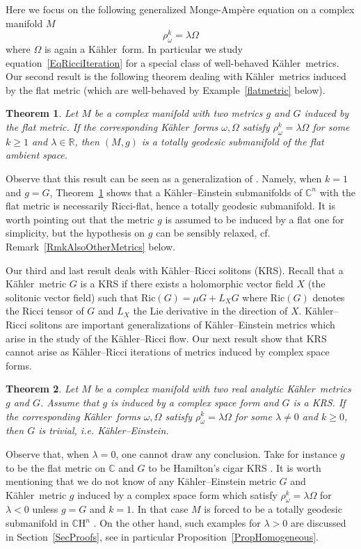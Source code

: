 \documentclass[12pt]{amsart}
\newcommand{\R}{\mathbb{R}}
\newcommand{\CH}{\mathbb{C}\mathrm{H}}
\newcommand{\Ric}{\mathrm{Ric}}
\newcommand{\C}{\mathbb{C}}
\newcommand{\K}{K\"{a}hler}
\newtheorem{theor}{Theorem}
\begin{document}
Here we focus on the following generalized Monge-Amp\`ere equation on a complex manifold $M$
\begin{equation}\label{EqRicciIteration}
	\rho^k_\omega=\lambda\Omega
\end{equation}
 where $\Omega$ is again a \K\ form.
In particular we study equation~\eqref{EqRicciIteration} for a special class of well-behaved \K\ metrics.
Our second result is the following theorem dealing with \K\ metrics induced by the flat metric (which are well-behaved by Example~\ref{flatmetric} below).


\begin{theor}\label{mainteor2}
Let $M$ be a  complex  manifold with two metrics $g$ and $G$ induced by the flat metric.
If the corresponding \K\ forms $\omega,\Omega$ satisfy 
$\rho_\omega^k=\lambda\Omega$ for some $k\geq 1$ and $\lambda\in\R$,
then $(M,g)$ is a totally geodesic submanifold of the flat ambient space.
\end{theor}

Observe that this result can be seen as a generalization of \cite[Theorem~2.1]{Umehara87Einstein}. 
Namely, when $k=1$ and $g=G$, Theorem~\ref{mainteor2} shows that a \K--Einstein submanifolds of $\C^n$ with the flat metric is necessarily Ricci-flat, hence a totally geodesic submanifold.
It is worth pointing out that the metric $g$ is assumed to be induced by a flat one for simplicity, but the hypothesis on $g$ can be sensibly relaxed, cf. Remark~\ref{RmkAlsoOtherMetrics} below.

Our third and last result deals with \K--Ricci solitons (KRS). Recall that a \K\ metric $G$ is a KRS  if there exists a holomorphic vector field $X$ (the solitonic vector field) such that $\Ric(G)=\mu G+L_XG$ where $\Ric(G)$ denotes the Ricci tensor of $G$ and $L_X$ the Lie derivative in the direction of $X$.
\K--Ricci solitons are important generalizations of \K--Einstein metrics which arise in the study of the \K--Ricci flow. 
Our next result show that KRS cannot arise as \K--Ricci iterations of metrics induced by complex space forms.

\begin{theor}\label{mainteor3}
Let $M$ be a  complex  manifold with two real analytic \K\ metrics $g$ and $G$.
Assume that $g$ is induced by a complex space form and $G$ is a KRS.
If the corresponding \K\ forms $\omega,\Omega$ satisfy 
$\rho_\omega^k=\lambda\Omega$ for some $\lambda\neq 0$ and $k\geq 0$,
then $G$ is trivial, i.e. \K--Einstein.
\end{theor}
Observe that, when $\lambda=0$, one cannot draw any conclusion. Take for instance $g$ to be the flat metric on $\C$ and $G$ to be Hamilton's cigar KRS \cite{Hamilton88RicciFlow}.
It is worth mentioning that we do not know of any \K--Einstein metric $G$ and \K\ metric $g$ induced by a complex space form which satisfy $\rho_\omega^k=\lambda\Omega$ for $\lambda<0$ unless $g=G$ and $k=1$.
 In that case $M$ is forced to be a totally geodesic submanifold in $\CH^n$ \cite{Umehara87Einstein}.
 On the other hand, such examples for $\lambda>0$ are discussed in Section~\ref{SecProofs}, see in particular Proposition~\ref{PropHomogeneous}.
\end{document}
